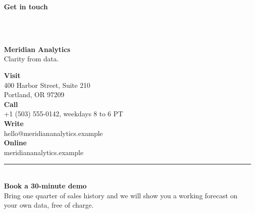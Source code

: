\documentclass[10pt]{article}
\newcommand{\panelhead}[1]{%
  \colorbox{accent}{\parbox[c][0.95cm][c]{\dimexpr\linewidth-2\fboxsep}{%
    \centering\color{white}\large\bfseries #1}}\\[8pt]}
\newenvironment{panel}
  {\begin{minipage}[t][16.5cm][t]{0.301\textwidth}\raggedright}
  {\end{minipage}}
\begin{document}
\begin{panel}
  \panelhead{Get in touch}
  \begin{center}
  \\[8pt]
  {\Large\bfseries\color{accent}Meridian Analytics}\\[2pt]
  {\small\color{inkgray}Clarity from data.}
  \end{center}

  \vspace{10pt}
  {\small
  {\bfseries\color{accent}Visit}\\
  {\color{inkgray}400 Harbor Street, Suite 210\\
  Portland, OR 97209}\\[7pt]
  {\bfseries\color{accent}Call}\\
  {\color{inkgray}+1 (503) 555-0142, weekdays 8 to 6 PT}\\[7pt]
  {\bfseries\color{accent}Write}\\
  {\color{inkgray}hello@meridiananalytics.example}\\[7pt]
  {\bfseries\color{accent}Online}\\
  {\color{inkgray}meridiananalytics.example}}

  \vspace{12pt}
  {\color{gold}\rule{\linewidth}{1.5pt}}\\[6pt]
  {\small\bfseries\color{accent}Book a 30-minute demo}\\
  {\small\color{inkgray}Bring one quarter of sales history and we will
  show you a working forecast on your own data, free of charge.}
\end{panel}
\end{document}
